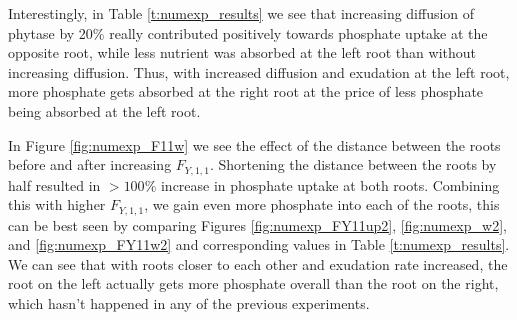 \documentclass[11pt]{article}
\numberwithin{equation}{section}
\begin{document}
Interestingly, in Table \ref{t:numexp_results} we see that increasing diffusion of phytase by 20\% really contributed positively towards phosphate uptake at the opposite root, while less nutrient was absorbed at the left root than without increasing diffusion. Thus, with increased diffusion and exudation at the left root, more phosphate gets absorbed at the right root at the price of less phosphate being absorbed at the left root.

In Figure \ref{fig:numexp_F11w} we see the effect of the distance between the roots before and after increasing $F_{Y,1,1}$. Shortening the distance between the roots by half resulted in $>100\%$ increase in phosphate uptake at both roots. Combining this with higher $F_{Y,1,1}$, we gain even more phosphate into each of the roots, this can be best seen by comparing Figures \ref{fig:numexp_FY11up2}, \ref{fig:numexp_w2}, and \ref{fig:numexp_FY11w2} and corresponding values in Table \ref{t:numexp_results}. We can see that with roots closer to each other and exudation rate increased, the root on the left actually gets more phosphate overall than the root on the right, which hasn't happened in any of the previous experiments.
\end{document}
